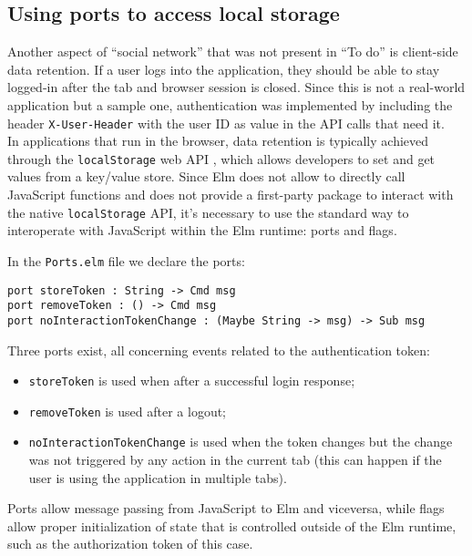 
\subsection{Using ports to access local storage}

Another aspect of ``social network'' that was not present in ``To do'' is client-side data retention. If a user logs into the application, they should be able to stay logged-in after the tab and browser session is closed. Since this is not a real-world application but a sample one, authentication was implemented by including the header \texttt{X-User-Header} with the user ID as value in the API calls that need it.\\

In applications that run in the browser, data retention is typically achieved through the \texttt{localStorage} web API \cite{noauthor_window_nodate}, which allows developers to set and get values from a key/value store. Since Elm does not allow to directly call JavaScript functions and does not provide a first-party package to interact with the native \texttt{localStorage} API, it's necessary to use the standard way to interoperate with JavaScript within the Elm runtime: ports and flags.

In the \texttt{Ports.elm} file we declare the ports:
\begin{verbatim}
port storeToken : String -> Cmd msg
port removeToken : () -> Cmd msg
port noInteractionTokenChange : (Maybe String -> msg) -> Sub msg
\end{verbatim}

Three ports exist, all concerning events related to the authentication token:
\begin{itemize}
    \item \texttt{storeToken} is used when after a successful login response;
    \item \texttt{removeToken} is used after a logout;
    \item \texttt{noInteractionTokenChange} is used when the token changes but the change was not triggered by any action in the current tab (this can happen if the user is using the application in multiple tabs).
\end{itemize}
Ports allow message passing from JavaScript to Elm and viceversa, while flags allow proper initialization of state that is controlled outside of the Elm runtime, such as the authorization token of this case.\\

